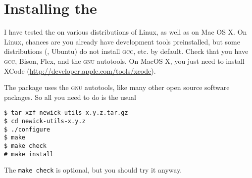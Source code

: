 \chapter{Installing the \nutils}

I have tested the \nutils{} on various distributions of Linux, as well as on
Mac OS X. On Linux, chances are you already have development tools
preinstalled, but some distributions (\eg, Ubuntu) do not install \textsc{gcc},
etc. by default. Check that you have \textsc{gcc},
Bison, Flex, and the \textsc{gnu} autotools. On MacOS X, you just need to
install XCode (\url{http://developer.apple.com/tools/xcode}). 

The package uses the \textsc{gnu} autotools, like many other open source
software packages. So all you need to do is the usual
\begin{verbatim}
$ tar xzf newick-utils-x.y.z.tar.gz
$ cd newick-utils-x.y.z
$ ./configure
$ make
$ make check
# make install
\end{verbatim}
The \texttt{make check} is optional, but you should try it anyway.
